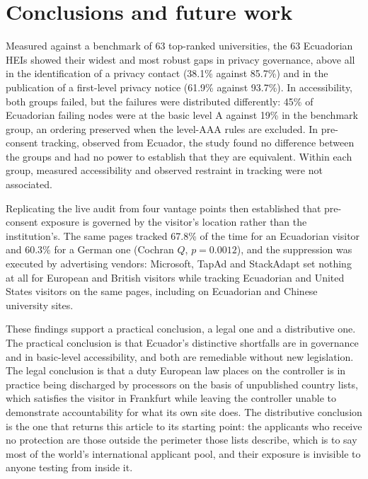 \documentclass[pdflatex,sn-basic,Numbered]{sn-jnl}
\theoremstyle{thmstyleone}
\theoremstyle{thmstyletwo}
\theoremstyle{thmstylethree}
\begin{document}
\section{Conclusions and future work}\label{sec:conclusions}

Measured against a benchmark of 63 top-ranked universities, the 63 Ecuadorian HEIs showed their widest and most robust gaps in privacy governance, above all in the identification of a privacy contact (38.1\% against 85.7\%) and in the publication of a first-level privacy notice (61.9\% against 93.7\%). In accessibility, both groups failed, but the failures were distributed differently: 45\% of Ecuadorian failing nodes were at the basic level A against 19\% in the benchmark group, an ordering preserved when the level-AAA rules are excluded. In pre-consent tracking, observed from Ecuador, the study found no difference between the groups and had no power to establish that they are equivalent. Within each group, measured accessibility and observed restraint in tracking were not associated.

Replicating the live audit from four vantage points then established that pre-consent exposure is governed by the visitor's location rather than the institution's. The same pages tracked 67.8\% of the time for an Ecuadorian visitor and 60.3\% for a German one (Cochran $Q$, $p=0.0012$), and the suppression was executed by advertising vendors: Microsoft, TapAd and StackAdapt set nothing at all for European and British visitors while tracking Ecuadorian and United States visitors on the same pages, including on Ecuadorian and Chinese university sites.

These findings support a practical conclusion, a legal one and a distributive one. The practical conclusion is that Ecuador's distinctive shortfalls are in governance and in basic-level accessibility, and both are remediable without new legislation. The legal conclusion is that a duty European law places on the controller is in practice being discharged by processors on the basis of unpublished country lists, which satisfies the visitor in Frankfurt while leaving the controller unable to demonstrate accountability for what its own site does. The distributive conclusion is the one that returns this article to its starting point: the applicants who receive no protection are those outside the perimeter those lists describe, which is to say most of the world's international applicant pool, and their exposure is invisible to anyone testing from inside it.
\end{document}
